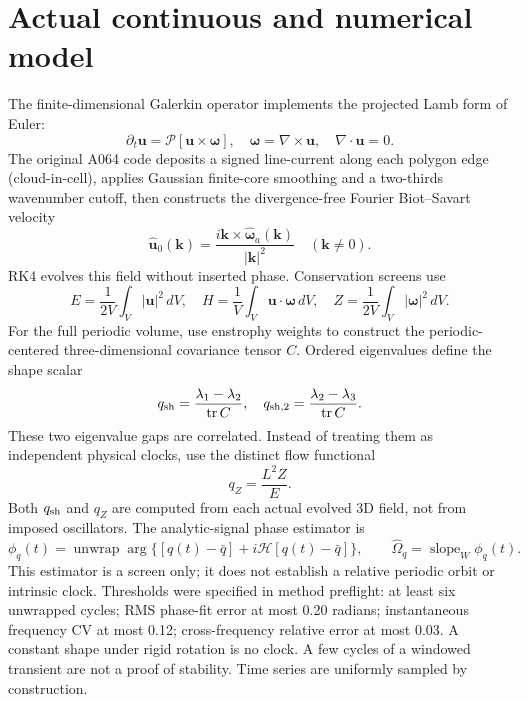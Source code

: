 \documentclass[11pt,a4paper]{article}
\begin{document}
\section{Actual continuous and numerical model}
The finite-dimensional Galerkin operator implements the projected Lamb form of Euler:
\begin{equation}\partial_t\mathbf u=\mathcal P[\mathbf u\times\bm\omega],\quad \bm\omega=\nabla\times\mathbf u,\quad \nabla\cdot\mathbf u=0.\label{eq:euler}\end{equation}
The original A064 code deposits a signed line-current along each polygon edge (cloud-in-cell), applies Gaussian finite-core smoothing and a two-thirds wavenumber cutoff, then constructs the divergence-free Fourier Biot--Savart velocity
\begin{equation}\widehat{\mathbf u}_0(\mathbf k)=\frac{i\mathbf k\times\widehat{\bm\omega}_a(\mathbf k)}{|\mathbf k|^2}\quad (\mathbf k\ne0).\label{eq:biotsavart}\end{equation}
RK4 evolves this field without inserted phase. Conservation screens use
\begin{equation}
E=\frac{1}{2V}\int_V|\mathbf u|^2\,dV,\quad H=\frac1V\int_V\mathbf u\cdot\bm\omega\,dV,\quad Z=\frac{1}{2V}\int_V|\bm\omega|^2\,dV.\label{eq:ehz}
\end{equation}
For the full periodic volume, use enstrophy weights to construct the periodic-centered three-dimensional covariance tensor $C$. Ordered eigenvalues define the shape scalar
\begin{equation}q_{\rm sh}=\frac{\lambda_1-\lambda_2}{\operatorname{tr}C},\quad q_{\rm sh,2}=\frac{\lambda_2-\lambda_3}{\operatorname{tr}C}.\end{equation}
These two eigenvalue gaps are correlated. Instead of treating them as independent physical clocks, use the distinct flow functional
\begin{equation}q_Z=\frac{L^2 Z}{E}.\label{eq:qz}\end{equation}
Both $q_{\rm sh}$ and $q_Z$ are computed from each actual evolved 3D field, not from imposed oscillators. The analytic-signal phase estimator is
\begin{equation}
\phi_q(t)=\operatorname{unwrap}\arg\{[q(t)-\bar q]+i\mathcal H[q(t)-\bar q]\},\qquad \widehat\Omega_q=\operatorname{slope}_{W}\phi_q(t).\label{eq:phase}
\end{equation}
This estimator is a screen only; it does not establish a relative periodic orbit or intrinsic clock. Thresholds were specified in method preflight: at least six unwrapped cycles; RMS phase-fit error at most 0.20 radians; instantaneous frequency CV at most 0.12; cross-frequency relative error at most 0.03. A constant shape under rigid rotation is no clock. A few cycles of a windowed transient are not a proof of stability. Time series are uniformly sampled by construction.
\end{document}
